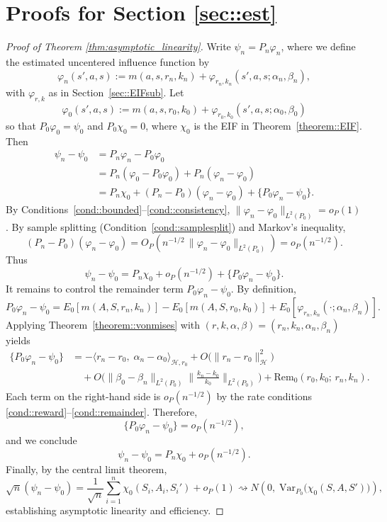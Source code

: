 \documentclass[11pt]{article}
\theoremstyle{plain}
\begin{document}
\section{Proofs for Section \ref{sec::est}}




\begin{proof}[Proof of Theorem \ref{thm:asymptotic_linearity}]

 
Write $\psi_n = P_n\varphi_n$, where we define the estimated uncentered influence function by
\[
\varphi_n(s',a,s)
:= m(a,s,r_n,k_n)
   + \varphi_{r_n,k_n}(s',a,s;\alpha_n,\beta_n),
\]
with $\varphi_{r,k}$ as in Section~\ref{sec::EIFsub}.  
Let
\[
\varphi_0(s',a,s)
:= m(a,s,r_0,k_0)
   + \varphi_{r_0,k_0}(s',a,s;\alpha_0,\beta_0)
\]
so that 
$P_0\varphi_0 = \psi_0$ and $P_0\chi_0 = 0$, where $\chi_0$ is the EIF in Theorem~\ref{theorem::EIF}.  
Then
\begin{align*}
    \psi_n - \psi_0
    &= P_n\varphi_n - P_0\varphi_0 \\
    &= P_n(\varphi_0 - P_0\varphi_0) + P_n(\varphi_n - \varphi_0) \\
    &= P_n\chi_0 + (P_n - P_0)(\varphi_n - \varphi_0) + \{P_0\varphi_n - \psi_0\}.
\end{align*}
By Conditions~\ref{cond::bounded}–\ref{cond::consistency},  
$\|\varphi_n - \varphi_0\|_{L^2(P_0)} = o_P(1)$.  
By sample splitting (Condition~\ref{cond::samplesplit}) and Markov’s inequality,
\[
(P_n - P_0)(\varphi_n - \varphi_0)
    = O_P\!\left(n^{-1/2}\,\|\varphi_n - \varphi_0\|_{L^2(P_0)}\right)
    = o_P(n^{-1/2}).
\]
Thus
\[
\psi_n - \psi_0
= P_n\chi_0 + o_P(n^{-1/2}) + \{P_0\varphi_n - \psi_0\}.
\]
It remains to control the remainder term $P_0\varphi_n - \psi_0$.  
By definition,
\[
P_0\varphi_n - \psi_0
= E_0[m(A,S,r_n,k_n)] - E_0[m(A,S,r_0,k_0)]
  + E_0[\varphi_{r_n,k_n}(\cdot;\alpha_n,\beta_n)].
\]
Applying Theorem~\ref{theorem::vonmises} with $(r,k,\alpha,\beta)=(r_n,k_n,\alpha_n,\beta_n)$ yields
\begin{align*}
\{P_0\varphi_n - \psi_0\}
&= - \langle r_n - r_0,\;\alpha_n - \alpha_0\rangle_{\mathcal{H},r_0}
   + O\!\big(\|r_n - r_0\|_{\mathcal{H}}^2\big) \\
&\quad 
   + O\!\Big(
      \Big\|\beta_0 - \beta_n\Big\|_{L^2(P_0)}
      \Big\|\tfrac{k_n - k_0}{k_0}\Big\|_{L^2(P_0)}
     \Big)
   + \mathrm{Rem}_0(r_0,k_0;\,r_n,k_n).
\end{align*}
Each term on the right-hand side is $o_P(n^{-1/2})$ by the rate conditions  
\ref{cond::reward}–\ref{cond::remainder}.  
Therefore,
\[
\{P_0\varphi_n - \psi_0\} = o_P(n^{-1/2}),
\]
and we conclude
\[
\psi_n - \psi_0
= P_n\chi_0 + o_P(n^{-1/2}).
\]
Finally, by the central limit theorem,
\[
\sqrt{n}(\psi_n - \psi_0)
= \frac{1}{\sqrt{n}}\sum_{i=1}^n \chi_0(S_i,A_i,S_i') + o_P(1)
\rightsquigarrow N\!\left(0,\;\text{Var}_{P_0}\!\big(\chi_0(S,A,S')\big)\right),
\]
establishing asymptotic linearity and efficiency.  
\end{proof}
\end{document}
